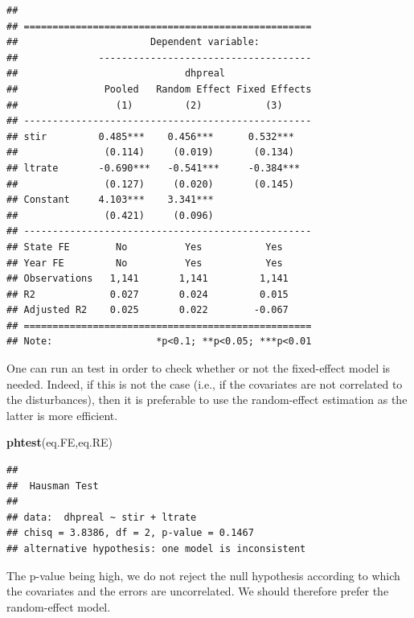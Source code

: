 \documentclass[
  12pt,
]{book}
\newenvironment{Shaded}{\begin{snugshade}}{\end{snugshade}}
\newcommand{\FunctionTok}[1]{\textcolor[rgb]{0.13,0.29,0.53}{\textbf{#1}}}
\newcommand{\NormalTok}[1]{#1}
\theoremstyle{definition}
\theoremstyle{definition}
\theoremstyle{definition}
\theoremstyle{definition}
\theoremstyle{remark}
\begin{document}
\begin{verbatim}
## 
## ==================================================
##                       Dependent variable:         
##              -------------------------------------
##                             dhpreal               
##               Pooled   Random Effect Fixed Effects
##                 (1)         (2)           (3)     
## --------------------------------------------------
## stir         0.485***    0.456***      0.532***   
##               (0.114)     (0.019)       (0.134)   
## ltrate       -0.690***   -0.541***     -0.384***  
##               (0.127)     (0.020)       (0.145)   
## Constant     4.103***    3.341***                 
##               (0.421)     (0.096)                 
## --------------------------------------------------
## State FE        No          Yes           Yes     
## Year FE         No          Yes           Yes     
## Observations   1,141       1,141         1,141    
## R2             0.027       0.024         0.015    
## Adjusted R2    0.025       0.022        -0.067    
## ==================================================
## Note:                  *p<0.1; **p<0.05; ***p<0.01
\end{verbatim}

One can run an \citet{Hausman_1978} test in order to check whether or not the fixed-effect model is needed. Indeed, if this is not the case (i.e., if the covariates are not correlated to the disturbances), then it is preferable to use the random-effect estimation as the latter is more efficient.

\begin{Shaded}
\begin{Highlighting}[]
\FunctionTok{phtest}\NormalTok{(eq.FE,eq.RE)}
\end{Highlighting}
\end{Shaded}

\begin{verbatim}
## 
##  Hausman Test
## 
## data:  dhpreal ~ stir + ltrate
## chisq = 3.8386, df = 2, p-value = 0.1467
## alternative hypothesis: one model is inconsistent
\end{verbatim}

The p-value being high, we do not reject the null hypothesis according to which the covariates and the errors are uncorrelated. We should therefore prefer the random-effect model.
\end{document}
